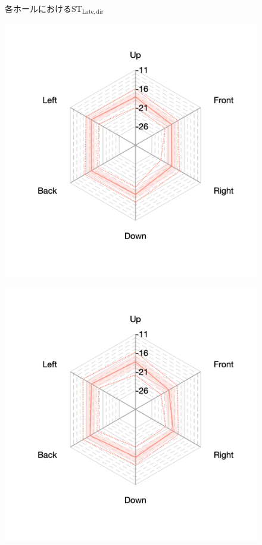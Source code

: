 \documentclass[11pt,a4j]{jreport}
\begin{document}
\begin{figure}[H]
\caption{各ホールにおける$\mathrm{ST_{Late,dir}}$}
\label{fig:各ホールにおけるSTLate}
\end{figure}


\newpage
\begin{figure}[H]
  \begin{minipage}[b]{.33\textwidth}
      \centering
      \includegraphics[width=1\linewidth]{images/realHallDirSt/early_S03_allhall.png}
      \label{fig:S03early}
  \end{minipage}%
  \begin{minipage}[b]{.33\textwidth}
    \centering
    \includegraphics[width=1\linewidth]{images/realHallDirSt/early_S02_allhall.png}

\end{minipage}
\end{figure}
\end{document}
